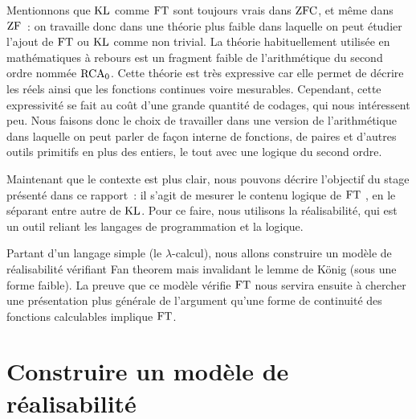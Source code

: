 \documentclass{article}
\begin{document}
Mentionnons que $\mathrm{KL}$ comme $\mathrm{FT}$ sont toujours vrais dans $\mathrm{ZFC}$, et même dans $\mathrm{ZF}$~: on travaille donc dans une théorie plus faible dans laquelle on peut étudier l'ajout de $\mathrm{FT}$ ou $\mathrm{KL}$ comme non trivial. La théorie habituellement utilisée en mathématiques à rebours est un fragment faible de l'arithmétique du second ordre nommée $\mathrm{RCA}_0$. Cette théorie est très expressive car elle permet de décrire les réels ainsi que les fonctions continues voire mesurables. Cependant, cette expressivité se fait au coût d'une grande quantité de codages, qui nous intéressent peu. Nous faisons donc le choix de travailler dans une version de l'arithmétique dans laquelle on peut parler de façon interne de fonctions, de paires et d'autres outils primitifs en plus des entiers, le tout avec une logique du second ordre.

Maintenant que le contexte est plus clair, nous pouvons décrire l'objectif du stage présenté dans ce rapport~: il s'agit de mesurer le contenu logique de $\mathrm{FT}$ , en le séparant entre autre de $\mathrm{KL}$. Pour ce faire, nous utilisons la réalisabilité, qui est un outil reliant les langages de programmation et la logique.

Partant d'un langage simple (le $\lambda$-calcul), nous allons construire un modèle de réalisabilité vérifiant Fan theorem mais invalidant le lemme de König (sous une forme faible).
La preuve que ce modèle vérifie $\mathrm{FT}$ nous servira ensuite à chercher une présentation plus générale de l'argument qu'une forme de continuité des fonctions calculables implique $\mathrm{FT}$.


\section{Construire un modèle de réalisabilité}
\end{document}
